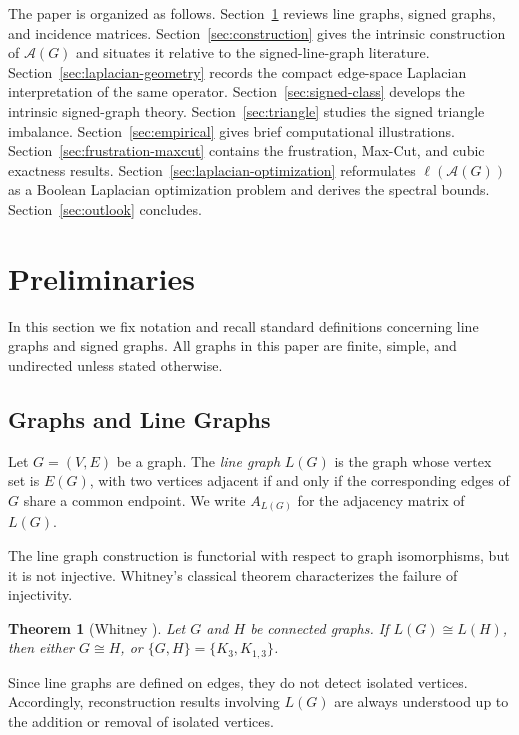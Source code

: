 \documentclass[11pt]{article}
\newtheorem{theorem}{Theorem}
\theoremstyle{plain}
\begin{document}
The paper is organized as follows.
Section~\ref{sec:preliminaries} reviews line graphs, signed graphs, and
incidence matrices.
Section~\ref{sec:construction} gives the intrinsic construction of
$\mathcal A(G)$ and situates it relative to the signed-line-graph literature.
Section~\ref{sec:laplacian-geometry} records the compact edge-space Laplacian
interpretation of the same operator.
Section~\ref{sec:signed-class} develops the intrinsic signed-graph theory.
Section~\ref{sec:triangle} studies the signed triangle imbalance.
Section~\ref{sec:empirical} gives brief computational illustrations.
Section~\ref{sec:frustration-maxcut} contains the frustration, Max-Cut, and
cubic exactness results.
Section~\ref{sec:laplacian-optimization} reformulates $\ell(\mathcal A(G))$ as
a Boolean Laplacian optimization problem and derives the spectral bounds.
Section~\ref{sec:outlook} concludes.


\section{Preliminaries}
\label{sec:preliminaries}

In this section we fix notation and recall standard definitions concerning line
graphs and signed graphs.
All graphs in this paper are finite, simple, and undirected unless stated
otherwise.

\subsection{Graphs and Line Graphs}

Let $G=(V,E)$ be a graph.
The \emph{line graph} $L(G)$ is the graph whose vertex set is $E(G)$, with two
vertices adjacent if and only if the corresponding edges of $G$ share a common
endpoint.
We write $A_{L(G)}$ for the adjacency matrix of $L(G)$.

The line graph construction is functorial with respect to graph isomorphisms, but
it is not injective.
Whitney’s classical theorem characterizes the failure of injectivity.

\begin{theorem}[Whitney {\cite{Whitney1932}}]
\label{thm:whitney}
Let $G$ and $H$ be connected graphs.
If $L(G)\cong L(H)$, then either $G\cong H$, or $\{G,H\}=\{K_3,K_{1,3}\}$.
\end{theorem}

Since line graphs are defined on edges, they do not detect isolated vertices.
Accordingly, reconstruction results involving $L(G)$ are always understood up to
the addition or removal of isolated vertices.
\end{document}
